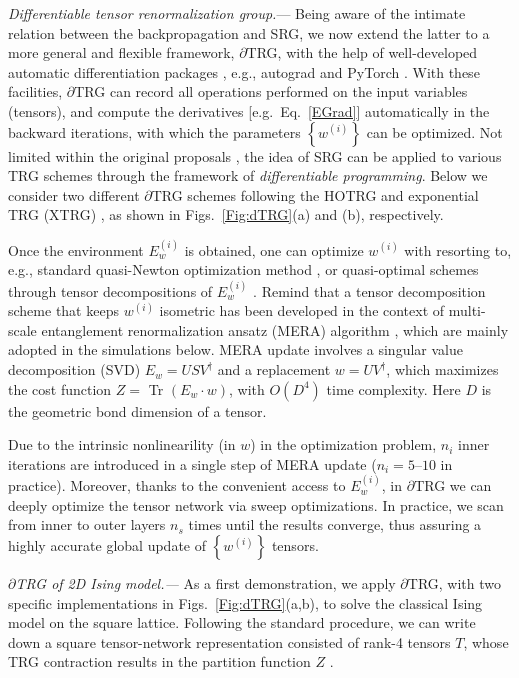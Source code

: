 \documentclass[aps,prx,twocolumn,showpacs,psfig,superscriptaddress,longbibliography]{revtex4-1}
\def\llb#1{\left\{#1\right\}}            %
\newcommand{\Eq}[1]{Eq.~\eqref{#1}}
\def\dTRG{$\partial$TRG\xspace}
\begin{document}
\textit{Differentiable tensor renormalization group.}--- Being aware of the intimate relation between the backpropagation and SRG, we now extend the latter to a more general and flexible framework, \dTRG, with the help of well-developed automatic differentiation packages \cite{Wright-NO2006}, e.g., autograd \cite{autograd} and PyTorch \cite{Pytorch,pytorch}. With these facilities, \dTRG can record all operations performed on the input variables (tensors), and compute the derivatives [e.g.~\Eq{EGrad}] automatically in the backward iterations, with which the parameters $\llb{w^{(i)}}$ can be optimized. Not limited within the original proposals \cite{Xie2009,Xie2012}, the idea of SRG can be applied to various TRG schemes through the framework of \textit{differentiable programming}. Below we consider two different \dTRG schemes following the HOTRG \cite{Xie2012} and exponential TRG (XTRG) \cite{Chen2018}, as shown in  Figs.~\ref{Fig:dTRG}(a) and (b), respectively.

Once the environment $E_w^{(i)}$ is obtained, one can optimize $w^{(i)}$ with resorting to, e.g., 
standard quasi-Newton optimization method \cite{SM}, or quasi-optimal schemes through  
tensor decompositions of $E_w^{(i)}$ \cite{Xie2009, Xie2012}. 
Remind that a tensor decomposition scheme that keeps $w^{(i)}$ isometric 
has been developed in the context of multi-scale entanglement renormalization ansatz (MERA) 
algorithm \cite{Vidal2007,Evenbly2009}, which are mainly adopted in the simulations below. 
MERA update involves a singular value decomposition (SVD) $E_w = U S V^\dagger$ and 
a replacement $w=U V^{\dagger}$, which maximizes the cost function 
$Z =$ Tr $(E_w \cdot w)$, with $O(D^4)$ time complexity. 
Here $D$ is the geometric bond dimension of a tensor.

Due to the intrinsic nonlinearility (in $w$) in the optimization problem, 
$n_i$ inner iterations are introduced in a single step of MERA update ($n_i=5$--$10$ in practice). 
Moreover, thanks to the convenient access to $E_w^{(i)}$, 
in \dTRG we can deeply optimize the tensor network via sweep optimizations. 
In practice, we scan from inner to outer layers $n_s$ times until the results converge, 
thus assuring a highly accurate global update of $\llb{w^{(i)}}$ tensors. 

\textit{\dTRG of 2D Ising model.---}  As a first demonstration, we apply \dTRG, 
with two specific implementations in Figs.~\ref{Fig:dTRG}(a,b), 
to solve the classical Ising model on the square lattice. Following the standard procedure, 
we can write down a square tensor-network representation consisted of rank-4 tensors $T$, 
whose TRG contraction results in the partition function $Z$ \cite{SM}.  
\end{document}
